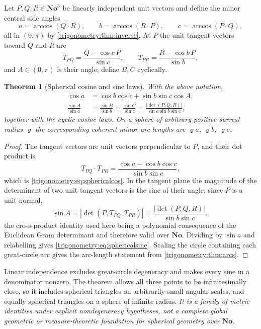 \documentclass[11pt,letterpaper]{article}
\numberwithin{equation}{section}
\newtheorem{theorem}{Theorem}[section]
\theoremstyle{definition}
\theoremstyle{remark}
\newcommand{\No}{\mathbf{No}}
\begin{document}
Let $P,Q,R\in\No^3$ be linearly independent unit vectors and define the minor central side angles
\[
 a=\arccos(Q\cdot R),\qquad b=\arccos(R\cdot P),\qquad c=\arccos(P\cdot Q),
\]
all in $(0,\pi)$ by \cref{trigonometry:thm:inverse}. At $P$ the unit tangent vectors toward $Q$ and
$R$ are
\[
 T_{PQ}=\frac{Q-\cos c\,P}{\sin c},\qquad T_{PR}=\frac{R-\cos b\,P}{\sin b},
\]
and $A\in(0,\pi)$ is their angle; define $B,C$ cyclically.

\begin{theorem}[Spherical cosine and sine laws]\label{trigonometry:thm:spherical}
With the above notation,
\begin{align}
 \cos a&=\cos b\cos c+\sin b\sin c\cos A,\label{trigonometry:eq:sphericalcos}\\
 \frac{\sin A}{\sin a}&=\frac{\sin B}{\sin b}=\frac{\sin C}{\sin c}
 =\frac{|\det(P,Q,R)|}{\sin a\sin b\sin c},\label{trigonometry:eq:sphericalsine}
\end{align}
together with the cyclic cosine laws. On a sphere of arbitrary positive surreal radius $\varrho$
the corresponding coherent minor arc lengths are $\varrho a$, $\varrho b$, $\varrho c$.
\end{theorem}
\begin{proof}
The tangent vectors are unit vectors perpendicular to $P$, and their dot product is
\[
 T_{PQ}\cdot T_{PR}=\frac{\cos a-\cos b\cos c}{\sin b\sin c},
\]
which is \cref{trigonometry:eq:sphericalcos}. In the tangent plane the magnitude of the determinant
of two unit tangent vectors is the sine of their angle; since $P$ is a unit normal,
\[
 \sin A=|\det(P,T_{PQ},T_{PR})|=\frac{|\det(P,Q,R)|}{\sin b\sin c},
\]
the cross-product identity used here being a polynomial consequence of the Euclidean Gram
determinant and therefore valid over $\No$. Dividing by $\sin a$ and relabelling gives
\cref{trigonometry:eq:sphericalsine}. Scaling the circle containing each great-circle arc gives the
arc-length statement from \cref{trigonometry:thm:arcs}.
\end{proof}
Linear independence excludes great-circle degeneracy and makes every sine in a denominator nonzero.
The theorem allows all three points to be infinitesimally close, so it includes spherical triangles
on arbitrarily small angular scales, and equally spherical triangles on a sphere of infinite
radius. \emph{It is a family of metric identities under explicit nondegeneracy hypotheses, not a
complete global geometric or measure-theoretic foundation for spherical geometry over $\No$.}
\end{document}
